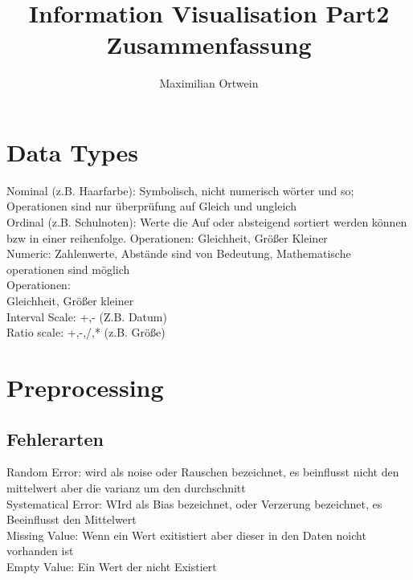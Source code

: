 \documentclass[a4paper]{scrartcl}
\begin{document}
\author{Maximilian Ortwein}
\title{Information Visualisation Part2 Zusammenfassung }
\fancyfoot[C]{\thepage}
\renewcommand{\footrulewidth}{0.5pt}
\renewcommand{\headrulewidth}{0.5pt}
\maketitle
\tableofcontents
\pagebreak

\section{Data Types} 
Nominal (z.B. Haarfarbe): Symbolisch, nicht numerisch wörter und so; Operationen sind nur überprüfung auf Gleich und ungleich\\

Ordinal (z.B. Schulnoten): Werte die Auf oder absteigend sortiert werden können bzw in einer reihenfolge. Operationen: Gleichheit, Größer Kleiner\\

Numeric: Zahlenwerte, Abstände sind von Bedeutung, Mathematische operationen sind möglich\\
Operationen:\\
Gleichheit, Größer kleiner\\
Interval Scale: +,-         (Z.B. Datum) \\   
Ratio scale: +,-,/,* (z.B. Größe)\\

\section{Preprocessing}
\subsection{Fehlerarten}
Random Error: wird als noise oder Rauschen bezeichnet, es beinflusst nicht den mittelwert aber die varianz um den durchschnitt\\
Systematical Error: WIrd als Bias bezeichnet, oder Verzerung bezeichnet, es Beeinflusst den Mittelwert\\

Missing Value: Wenn ein Wert exitistiert aber dieser in den Daten noicht vorhanden ist\\

Empty Value: Ein Wert der nicht Existiert\\
\end{document}
